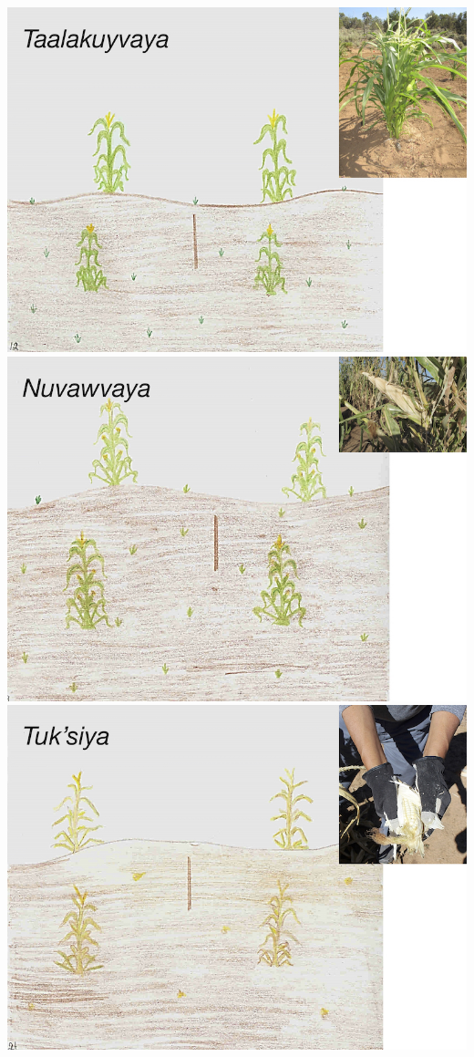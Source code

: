 \documentclass[12pt,]{article}
\begin{document}
\includegraphics{./images/hopi_growth/4_taalakuyvaya.jpg}
\includegraphics{./images/hopi_growth/5_nuvawvaya.jpg}
\includegraphics{./images/hopi_growth/6_tuksiya.jpg}
\end{document}
